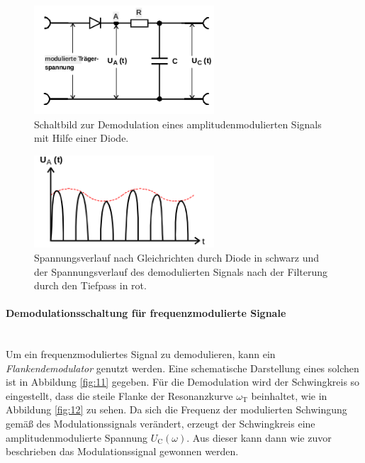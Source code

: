 \begin{figure}
  \centering
  \includegraphics[width=0.6\textwidth]{figures/gleichrichterdiode.PNG}
  \caption{Schaltbild zur Demodulation eines amplitudenmodulierten Signals mit Hilfe einer Diode.\cite{sample}}
  \label{fig:8}
\end{figure}

\begin{figure}
\centering
\includegraphics[width=0.6\textwidth]{figures/spannung_diode.PNG}
\caption{Spannungsverlauf nach Gleichrichten durch Diode in schwarz
und der Spannungsverlauf des demodulierten Signals nach der Filterung durch den Tiefpass in rot.\cite{sample}}
\label{fig:gleichgerichtet}
\end{figure}

\FloatBarrier

\paragraph{Demodulationsschaltung für frequenzmodulierte Signale}
\mbox{}\\
Um ein frequenzmoduliertes Signal zu demodulieren, kann ein
\textit{Flankendemodulator} genutzt werden.
Eine schematische Darstellung eines solchen ist in Abbildung \ref{fig:11}
gegeben. Für die Demodulation wird der Schwingkreis so eingestellt, dass
die steile Flanke der Resonanzkurve $\omega_{\text{T}}$ beinhaltet, wie in Abbildung \ref{fig:12} zu sehen.
Da sich die Frequenz der modulierten Schwingung gemäß des Modulationssignals
verändert, erzeugt der Schwingkreis eine amplitudenmodulierte Spannung
$U_{\text{C}}(\omega)$. Aus dieser kann dann wie zuvor beschrieben das
Modulationssignal gewonnen werden.

